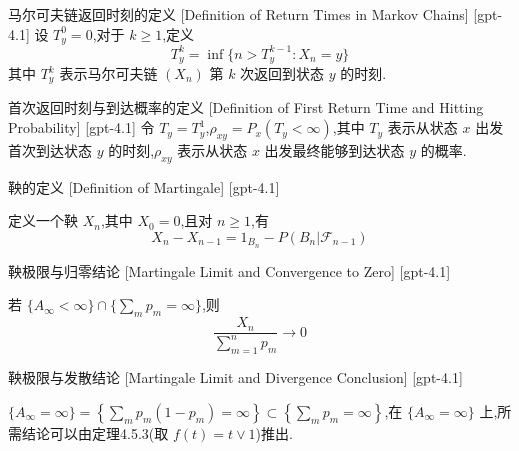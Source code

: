 \documentclass[UTF8]{ctexart}
\begin{document}
    
    
    \begin{dfn}
        {马尔可夫链返回时刻的定义}
        [Definition of Return Times in Markov Chains]
        [gpt-4.1]
        设 $T_{y}^{0} = 0$,对于 $k \geq 1$,定义
\[
T_{y}^{k} = \operatorname{inf}\{ n > T_{y}^{k-1} : X_{n} = y \}
\]
其中 $T_{y}^{k}$ 表示马尔可夫链 $(X_n)$ 第 $k$ 次返回到状态 $y$ 的时刻.
    \end{dfn}
    
    
    
    \begin{dfn}
        {首次返回时刻与到达概率的定义}
        [Definition of First Return Time and Hitting Probability]
        [gpt-4.1]
        令 $T_{y} = T_{y}^{1}$,$\rho_{xy} = P_{x}(T_{y} < \infty)$,其中 $T_{y}$ 表示从状态 $x$ 出发首次到达状态 $y$ 的时刻,$\rho_{xy}$ 表示从状态 $x$ 出发最终能够到达状态 $y$ 的概率.
    \end{dfn}
    
    
    
    \begin{dfn}
        {鞅的定义}
        [Definition of Martingale]
        [gpt-4.1]
        
定义一个鞅 $X_n$,其中 $X_0 = 0$,且对 $n \geq 1$,有
\[
X_n - X_{n-1} = 1_{B_n} - P(B_n | \mathcal{F}_{n-1})
\]

    \end{dfn}
    
    
    
    \begin{thm}
        {鞅极限与归零结论}
        [Martingale Limit and Convergence to Zero]
        [gpt-4.1]
        
若 $\{A_\infty < \infty\} \cap \{\sum_m p_m = \infty\}$,则
\[
\frac{X_n}{\sum_{m=1}^n p_m} \to 0
\]

    \end{thm}
    
    
    
    \begin{thm}
        {鞅极限与发散结论}
        [Martingale Limit and Divergence Conclusion]
        [gpt-4.1]
        
$\{A_\infty = \infty\} = \left\{ \sum_m p_m (1 - p_m) = \infty \right\} \subset \left\{ \sum_m p_m = \infty \right\}$,在 $\{A_\infty = \infty\}$ 上,所需结论可以由定理4.5.3(取 $f(t) = t \vee 1$)推出.

    \end{thm}
    
\end{document}

